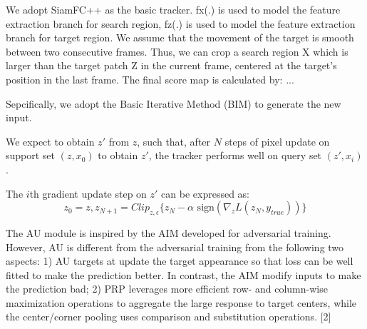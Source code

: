 \documentclass[journal]{IEEEtran}
\begin{document}
We adopt SiamFC++ as the basic tracker. fx(.) is used to model the feature extraction branch for search region, fz(.) is used to model the feature extraction branch for target region. We assume that the movement of the target is smooth between two consecutive frames. Thus, we can crop a search region X which is larger than the target patch Z in the current frame, centered at the target’s position in the last frame. The final score map is calculated by: ...

Sepcifically, we adopt the Basic Iterative Method (BIM) to generate the new input.

We expect to obtain $z'$ from $z$, such that, after $N$ steps of pixel update on support set $(z, x_0)$ to obtain $z'$, the tracker performs well on query set $(z', x_i)$.

The $i$th gradient update step on $z'$ can be expressed as:
$$
z_0 = z, z_{N+1} = Clip_{z,\epsilon}\{z_N -\alpha \text{ sign}(\nabla_z L(z_N,y_{true}))\}
$$

The AU module is inspired by the AIM developed for adversarial training. However, AU is different from the adversarial training from the following two aspects: 1) AU targets at update the target appearance so that loss can be well fitted to make the prediction better. In contrast, the AIM modify inputs to make the prediction bad; 2) PRP leverages more efficient row- and column-wise maximization operations to aggregate the large response to target centers, while the center/corner pooling uses comparison and substitution operations. [2]
\end{document}
